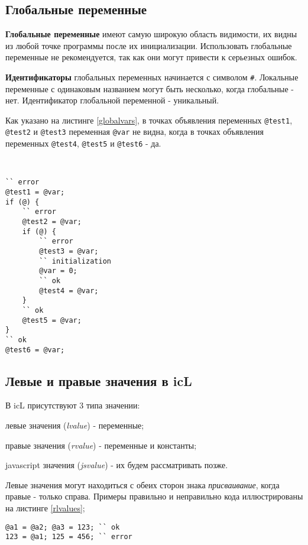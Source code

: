\subsection{Глобальные переменные}

\textbf{Глобальные переменные} имеют самую широкую область видимости, их видны из любой точке программы после их инициализации. Использовать глобальные переменные не рекомендуется, так как они могут привести к серьезных ошибок.

{\bf Идентификаторы} глобальных переменных начинается с символом {\color{blue2}\lstinline|#|}. Локальные переменные с одинаковым названием могут быть несколько, когда глобальные - нет. Идентификатор глобальной переменной - уникальный.

Как указано на листинге \ref{globalvars}, в точках объявления переменных \lstinline|@test1|, \lstinline|@test2| и \lstinline|@test3| переменная \lstinline|@var| не видна, когда в точках объявления переменных \lstinline|@test4|, \lstinline|@test5| и \lstinline|@test6| - да.

\

\begin{lstlisting}[caption=Область видимости глобальных перемен, label=globalvars]
`` error
@test1 = @var;
if (@) {
	`` error
	@test2 = @var;
	if (@) {
		`` error
		@test3 = @var;
		`` initialization
		@var = 0;
		`` ok
		@test4 = @var;
	}
	`` ok
	@test5 = @var;
}
`` ok
@test6 = @var;
\end{lstlisting}

\subsection{Левые и правые значения в icL}

В icL присутствуют 3 типа значении:

\begin{icEnum}
\item
	левые значения ({\it lvalue}) - переменные;
\item
	правые значения ({\it rvalue}) - переменные и константы;
\item
	javascript значения ({\it jsvalue}) - их будем рассматривать позже.
\end{icEnum}

Левые значения могут находиться с обеих сторон знака {\it присваивание}, когда правые - только справа. Примеры правильно и неправильно кода иллюстрированы на листинге \ref{rlvalues};

\begin{lstlisting}[caption=Левые и правые значения, label=rlvalues]
@a1 = @a2; @a3 = 123; `` ok
123 = @a1; 125 = 456; `` error
\end{lstlisting}

